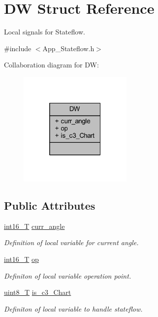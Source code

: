 \hypertarget{struct_d_w}{}\section{DW Struct Reference}
\label{struct_d_w}


Local signals for Stateflow.  




{\ttfamily \#include $<$App\+\_\+\+Stateflow.\+h$>$}



Collaboration diagram for DW\+:
\nopagebreak
\begin{figure}[H]
\begin{center}
\leavevmode
\includegraphics[width=157pt]{struct_d_w__coll__graph}
\end{center}
\end{figure}
\subsection*{Public Attributes}
\begin{DoxyCompactItemize}
\item 
\mbox{\hyperlink{_app___stateflowtypes_8h_ad73c6af88bb2ce70799e51f639309f21}{int16\+\_\+T}} \mbox{\hyperlink{struct_d_w_ab0801640ad5fc131a2c3e085d9986836}{curr\+\_\+angle}}
\begin{DoxyCompactList}\small\item\em Definition of local variable for current angle. \end{DoxyCompactList}\item 
\mbox{\hyperlink{_app___stateflowtypes_8h_ad73c6af88bb2ce70799e51f639309f21}{int16\+\_\+T}} \mbox{\hyperlink{struct_d_w_a2736d80f513d2e420f13698e8baa6c59}{op}}
\begin{DoxyCompactList}\small\item\em Definiton of local variable operation point. \end{DoxyCompactList}\item 
\mbox{\hyperlink{_app___stateflowtypes_8h_a2532a6244e023eee49f315c10f1f7c53}{uint8\+\_\+T}} \mbox{\hyperlink{struct_d_w_a3b1191ce727da1e17f5a8923eb06ae80}{is\+\_\+c3\+\_\+\+Chart}}
\begin{DoxyCompactList}\small\item\em Definiton of local variable to handle stateflow. \end{DoxyCompactList}\end{DoxyCompactItemize}


